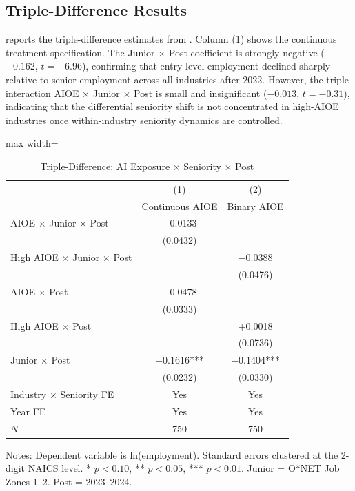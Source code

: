 \documentclass[12pt]{article}
\begin{document}
\subsection{Triple-Difference Results}

 reports the triple-difference estimates from . Column (1) shows the continuous treatment specification. The Junior $\times$ Post coefficient is strongly negative ($-0.162$, $t = -6.96$), confirming that entry-level employment declined sharply relative to senior employment across all industries after 2022. However, the triple interaction AIOE $\times$ Junior $\times$ Post is small and insignificant ($-0.013$, $t = -0.31$), indicating that the differential seniority shift is not concentrated in high-AIOE industries once within-industry seniority dynamics are controlled.

\begin{table}[H]
\centering
\caption{Triple-Difference: AI Exposure $\times$ Seniority $\times$ Post}
\label{tab:ddd}
\begin{threeparttable}
\begin{adjustbox}{max width=\textwidth}
\begin{tabular}{lcc}
\toprule
 & (1) & (2) \\
 & Continuous AIOE & Binary AIOE \\
\midrule
AIOE $\times$ Junior $\times$ Post & $-$0.0133 & \\
 & (0.0432) & \\
High AIOE $\times$ Junior $\times$ Post & & $-$0.0388 \\
 & & (0.0476) \\
AIOE $\times$ Post & $-$0.0478 & \\
 & (0.0333) & \\
High AIOE $\times$ Post & & $+$0.0018 \\
 & & (0.0736) \\
Junior $\times$ Post & $-$0.1616*** & $-$0.1404*** \\
 & (0.0232) & (0.0330) \\
\midrule
Industry $\times$ Seniority FE & Yes & Yes \\
Year FE & Yes & Yes \\
$N$ & 750 & 750 \\
\bottomrule
\end{tabular}
\end{adjustbox}
\begin{tablenotes}[flushleft]
\small
\item Notes: Dependent variable is ln(employment). Standard errors clustered at the 2-digit NAICS level. * $p<0.10$, ** $p<0.05$, *** $p<0.01$. Junior = O*NET Job Zones 1--2. Post = 2023--2024.
\end{tablenotes}
\end{threeparttable}
\end{table}
\end{document}
